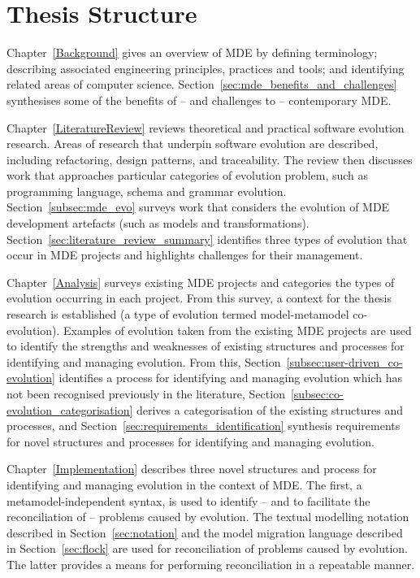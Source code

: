 
\section{Thesis Structure}
Chapter~\ref{Background} gives an overview of MDE by defining terminology; describing associated engineering principles, practices and tools; and identifying related areas of computer science. Section~\ref{sec:mde_benefits_and_challenges} synthesises some of the benefits of -- and challenges to -- contemporary MDE.

Chapter~\ref{LiteratureReview} reviews theoretical and practical software evolution research. Areas of research that underpin software evolution are described, including refactoring, design patterns, and traceability. The review then discusses work that approaches particular categories of evolution problem, such as programming language, schema and grammar evolution. Section~\ref{subsec:mde_evo} surveys work that considers the evolution of MDE development artefacts (such as models and transformations). Section~\ref{sec:literature_review_summary} identifies three types of evolution that occur in MDE projects and highlights challenges for their management.

Chapter~\ref{Analysis} surveys existing MDE projects and categories the types of evolution occurring in each project. From this survey, a context for the thesis research is established (a type of evolution termed model-metamodel co-evolution). Examples of evolution taken from the existing MDE projects are used to identify the strengths and weaknesses of existing structures and processes for identifying and managing evolution. From this, Section~\ref{subsec:user-driven_co-evolution} identifies a process for identifying and managing evolution which has not been recognised previously in the literature, Section~\ref{subsec:co-evolution_categorisation} derives a categorisation of the existing structures and processes, and Section~\ref{sec:requirements_identification} synthesis requirements for novel structures and processes for identifying and managing evolution.

Chapter~\ref{Implementation} describes three novel structures and process for identifying and managing evolution in the context of MDE. The first, a metamodel-independent syntax, is used to identify -- and to facilitate the reconciliation of -- problems caused by evolution. The textual modelling notation described in Section~\ref{sec:notation} and the model migration language described in Section~\ref{sec:flock} are used for reconciliation of problems caused by evolution. The latter provides a means for performing reconciliation in a repeatable manner.

